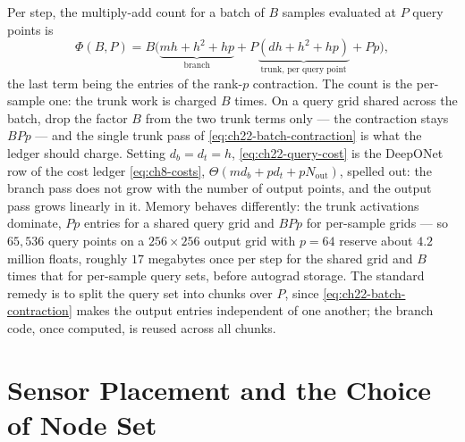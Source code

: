 Per step, the multiply-add count for a batch of $B$ samples evaluated at $P$ query points is
\begin{equation}
  \label{eq:ch22-query-cost}
  \Phi(B, P) = B \Big( \underbrace{mh + h^{2} + hp}_{\text{branch}} + P \underbrace{(dh + h^{2} + hp)}_{\text{trunk, per query point}} + Pp \Big),
\end{equation}
the last term being the entries of the rank-$p$ contraction. The count is the per-sample one:
the trunk work is charged $B$ times. On a query grid shared across the batch, drop the factor
$B$ from the two trunk terms only --- the contraction stays $B P p$ --- and the single trunk pass of
\eqref{eq:ch22-batch-contraction} is what the ledger should charge. Setting $d_b = d_t = h$,
\eqref{eq:ch22-query-cost} is
the DeepONet row of the cost ledger \eqref{eq:ch8-costs}, $\Theta(m d_b + p d_t + p N_{\mathrm{out}})$,
spelled out: the branch pass does not grow with the number of output
points, and the output pass grows linearly in it. Memory behaves differently: the trunk activations dominate, $P p$ entries for a shared query
grid and $B P p$ for per-sample grids --- so $65{,}536$ query points on a $256 \times 256$ output
grid with $p = 64$ reserve about $4.2$ million floats, roughly $17$ megabytes once per step for
the shared grid and $B$ times that for per-sample query sets, before
autograd storage.
The standard remedy is to split the query set into chunks over $P$, since
\eqref{eq:ch22-batch-contraction} makes the output entries independent of one another; the
branch code, once computed, is reused across all chunks.

\section{Sensor Placement and the Choice of Node Set}
\label{sec:ch22-sensors}

